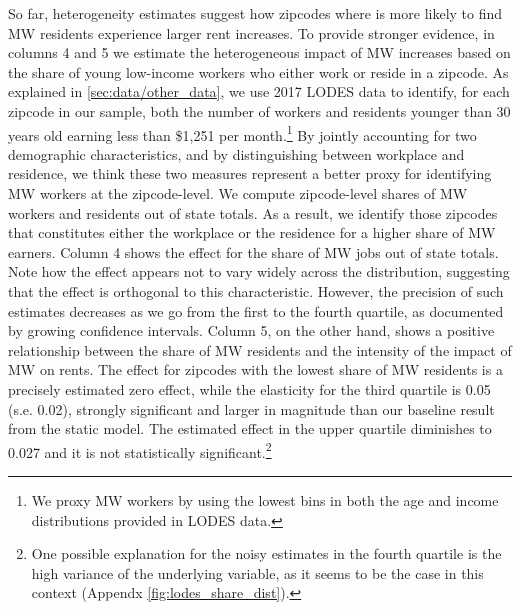 

So far, heterogeneity estimates suggest how zipcodes where is more likely to find MW residents experience 
larger rent increases. To provide stronger evidence, in columns 4 and 5 we estimate the heterogeneous
impact of MW increases based on the share of young low-income workers who either work or reside in a zipcode.  
As explained in \autoref{sec:data/other_data}, we use 2017 LODES data to identify, for each zipcode in our sample, 
both the number of workers and residents younger than 30 years old earning less than \$1,251 per month.\footnote{We 
proxy MW workers by using the lowest bins in both the age and income distributions provided in LODES data.} 
By jointly accounting for two demographic characteristics, and by distinguishing between workplace and residence, 
we think these two measures represent a better proxy for identifying MW workers at the zipcode-level.
We compute zipcode-level shares of MW workers and residents out of state totals. As a 
result, we identify those zipcodes that constitutes either the workplace or the residence for a 
higher share of MW earners. Column 4 shows the effect for the share of MW jobs out of state totals. 
Note how the effect appears not to vary widely across the distribution, suggesting that the effect 
is orthogonal to this characteristic. However, the precision of such estimates decreases as we go 
from the first to the fourth quartile, as documented by growing confidence intervals. Column 5, on 
the other hand, shows a positive relationship between the share of MW residents and the intensity 
of the impact of MW on rents. The effect for zipcodes with the lowest share of MW residents is a 
precisely estimated zero effect, while the elasticity for the third quartile is 0.05 (s.e. 
0.02), strongly significant and larger in magnitude than our baseline result from the static model. 
The estimated effect in the upper quartile diminishes to 0.027 and it is not statistically 
significant.\footnote{\label{ft:long_tail}  %
One possible explanation for the noisy estimates in the fourth quartile is the high variance of the 
underlying variable, as it seems to be the case in this context (Appendx \autoref{fig:lodes_share_dist}).}

